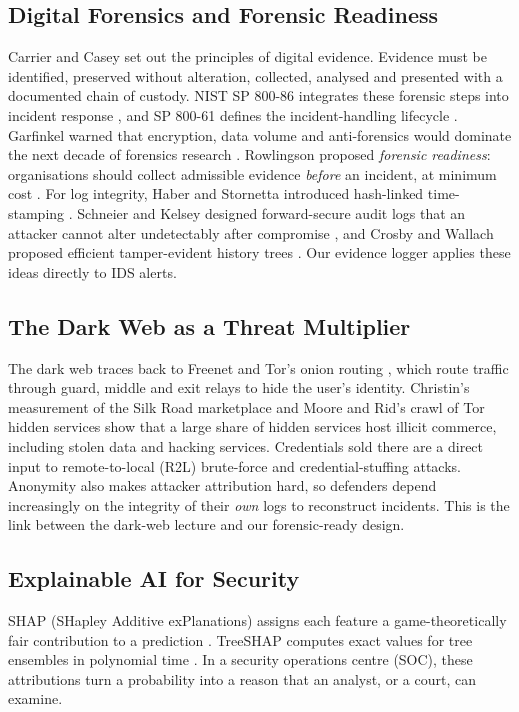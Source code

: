 \documentclass[12pt,a4paper,oneside]{article}
\begin{document}
\subsection{Digital Forensics and Forensic Readiness}
Carrier \cite{carrier2005file} and Casey \cite{casey2011digital} set out the principles of digital evidence. Evidence must be identified, preserved without alteration, collected, analysed and presented with a documented chain of custody. NIST SP 800-86 integrates these forensic steps into incident response \cite{kent2006sp80086}, and SP 800-61 defines the incident-handling lifecycle \cite{cichonski2012sp80061}. Garfinkel warned that encryption, data volume and anti-forensics would dominate the next decade of forensics research \cite{garfinkel2010digital}. Rowlingson proposed \emph{forensic readiness}: organisations should collect admissible evidence \emph{before} an incident, at minimum cost \cite{rowlingson2004ten}. For log integrity, Haber and Stornetta introduced hash-linked time-stamping \cite{haber1991time}. Schneier and Kelsey designed forward-secure audit logs that an attacker cannot alter undetectably after compromise \cite{schneier1999secure}, and Crosby and Wallach proposed efficient tamper-evident history trees \cite{crosby2009efficient}. Our evidence logger applies these ideas directly to IDS alerts.

\subsection{The Dark Web as a Threat Multiplier}
The dark web traces back to Freenet \cite{clarke2001freenet} and Tor's onion routing \cite{dingledine2004tor}, which route traffic through guard, middle and exit relays to hide the user's identity. Christin's measurement of the Silk Road marketplace \cite{christin2013traveling} and Moore and Rid's crawl of Tor hidden services \cite{moore2016cryptopolitik} show that a large share of hidden services host illicit commerce, including stolen data and hacking services. Credentials sold there are a direct input to remote-to-local (R2L) brute-force and credential-stuffing attacks. Anonymity also makes attacker attribution hard, so defenders depend increasingly on the integrity of their \emph{own} logs to reconstruct incidents. This is the link between the dark-web lecture and our forensic-ready design.

\subsection{Explainable AI for Security}
SHAP (SHapley Additive exPlanations) assigns each feature a game-theoretically fair contribution to a prediction \cite{lundberg2017unified}. TreeSHAP computes exact values for tree ensembles in polynomial time \cite{lundberg2020local}. In a security operations centre (SOC), these attributions turn a probability into a reason that an analyst, or a court, can examine.
\end{document}
